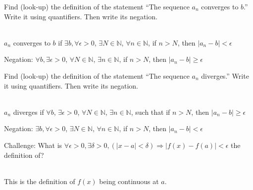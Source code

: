 \documentclass[12 pt]{exam}
\begin{document}
\begin{questions}
\begin{parts}
\end{parts}


\question Find (look-up) the definition of the statement ``The sequence $a_n$ converges to $b$.''  Write it using quantifiers. Then write its negation. 
\begin{solution}\\
$a_n$ converges to $b$ if $\exists b, \forall \epsilon > 0$, $\exists N \in \mathbb{N}$, $\forall n \in \mathbb{N}$, if $n > N$, then $|a_n - b| < \epsilon$

Negation: $\forall b, \exists \epsilon > 0$, $\forall N \in \mathbb{N}$, $\exists n \in \mathbb{N}$, if $n > N$, then $|a_n - b| \ge \epsilon$
\end{solution}


\question Find (look-up) the definition of the statement ``The sequence $a_n$ diverges.''  Write it using quantifiers. Then write its negation. 
\begin{solution}\\
$a_n$ diverges if $\forall b$, $\exists \epsilon > 0$, $\forall N \in \mathbb{N}$, $\exists n \in \mathbb{N}$, such that if $n > N$, then $|a_n - b| \ge \epsilon$

Negation: $\exists b, \forall \epsilon > 0$, $\exists N \in \mathbb{N}$, $\forall n \in \mathbb{N}$, if $n > N$, then $|a_n - b| < \epsilon$
\end{solution}


\newpage
\question Challenge: What is $\forall \epsilon > 0, \exists \delta > 0, (|x-a| < \delta) \Rightarrow |f(x) - f(a)| < \epsilon$ the definition of?
\begin{solution} \\
This is the definition of $f(x)$ being continuous at $a$.
\end{solution}


\end{questions}
\end{document}
